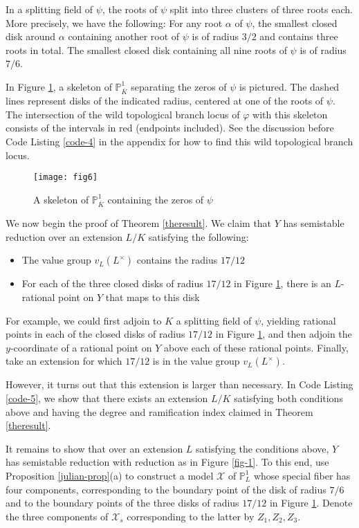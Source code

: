 \documentclass[11pt]{amsart}
\renewcommand{\phi}{\varphi}
\newcommand{\BP}{{\mathbb{P}}}
\newcommand{\CX}{{\mathcal X}}
\theoremstyle{definition}
\begin{document}
In a splitting field of $\psi$, the roots of $\psi$ split into three clusters of three roots each. More precisely, we have the following: For any root $\alpha$ of $\psi$, the smallest closed disk around $\alpha$ containing another root of $\psi$ is of radius $3/2$ and contains three roots in total. The smallest closed disk containing all nine roots of $\psi$ is of radius $7/6$.

In Figure \ref{fig-6}, a skeleton of $\BP^1_{\overline{K}}$ separating the zeros of $\psi$ is pictured. The dashed lines represent disks of the indicated radius, centered at one of the roots of $\psi$. The intersection of the wild topological branch locus of $\phi$ with this skeleton consists of the intervals in red (endpoints included). See the discussion before Code Listing \ref{code-4} in the appendix for how to find this wild topological branch locus.




\begin{figure}[!htb]
\centering
\texttt{[image: fig6]}
\caption{A skeleton of $\BP^1_{\overline{K}}$ containing the zeros of $\psi$}
\label{fig-6}
\end{figure}


We now begin the proof of Theorem \ref{theresult}. We claim that $Y$ has semistable reduction over an extension $L/K$ satisfying the following:
\begin{itemize}
\item The value group $v_L(L^\times)$ contains the radius $17/12$
\item For each of the three closed disks of radius $17/12$ in Figure \ref{fig-6}, there is an $L$-rational point on $Y$ that maps to this disk
\end{itemize}
For example, we could first adjoin to $K$ a splitting field of $\psi$, yielding rational points in each of the closed disks of radius $17/12$ in Figure \ref{fig-6}, and then adjoin the $y$-coordinate of a rational point on $Y$ above each of these rational points. Finally, take an extension for which $17/12$ is in the value group $v_L(L^\times)$.

However, it turns out that this extension is larger than necessary. In Code Listing \ref{code-5}, we show that there exists an extension $L/K$ satisfying both conditions above and having the degree and ramification index claimed in Theorem \ref{theresult}.

It remains to show that over an extension $L$ satisfying the conditions above, $Y$ has semistable reduction with reduction as in Figure \ref{fig-1}. To this end, use Proposition \ref{julian-prop}(a) to construct a model $\CX$ of $\BP^1_L$ whose special fiber has four components, corresponding to the boundary point of the disk of radius $7/6$ and to the boundary points of the three disks of radius $17/12$ in Figure \ref{fig-6}. Denote the three components of $\CX_s$ corresponding to the latter by $Z_1,Z_2,Z_3$. 
\end{document}
